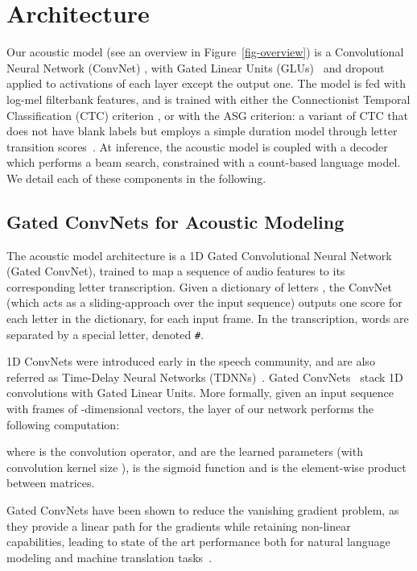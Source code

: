\documentclass{article}
\begin{document}
\section{Architecture}

Our acoustic model (see an overview in Figure~\ref{fig-overview}) is a
Convolutional Neural Network (ConvNet) \citep{lecun1995convolutional}, with
Gated Linear Units (GLUs)~\citep{dauphin2017lm} and dropout applied to activations
of each layer except the output one. The model is fed with
log-mel filterbank features, and is trained with either the Connectionist
Temporal Classification (CTC) criterion \citep{graves2006connectionist}, or with the ASG criterion: a variant of CTC that does not have blank labels but employs a simple duration model through letter transition scores~\citep{collobert2016wav2letter}. At inference, the acoustic model is coupled
with a decoder which performs a beam search, constrained with a count-based
language model. We detail each of these components in the following.

\subsection{Gated ConvNets for Acoustic Modeling}
\label{sec-glu}

The acoustic model architecture is a 1D Gated Convolutional Neural Network
(Gated ConvNet), trained to map a sequence of audio features to its
corresponding letter transcription. Given a dictionary of letters , the ConvNet (which acts as a sliding-approach over the input
sequence) outputs one score for each letter in the dictionary, for each
input frame. In the transcription, words are separated by a special letter,
denoted \texttt{\small \#}.


1D ConvNets were introduced early in the speech community, and are also
referred as Time-Delay Neural Networks
(TDNNs)~\citep{waibel1989tdnn}. Gated ConvNets~\citep{dauphin2017lm} stack
1D convolutions with Gated Linear Units. More formally, given an input
sequence  with  frames of
-dimensional vectors, the  layer of our network performs the
following computation:

where  is the convolution operator,  and  are the
learned parameters (with convolution kernel size ),  is the sigmoid function and  is the element-wise product between matrices.

Gated ConvNets have been shown to reduce the vanishing gradient problem, as
they provide a linear path for the gradients while retaining non-linear
capabilities, leading to state of the art performance both for natural
language modeling and machine translation
tasks~\citep{dauphin2017lm,gehring2017mt}.
\end{document}
